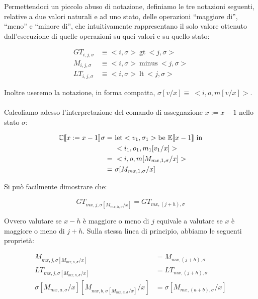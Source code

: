     Permettendoci un piccolo abuso di notazione, definiamo le tre notazioni seguenti, relative a due valori naturali e ad uno stato, delle operazioni ``maggiore di'', ``meno'' e ``minore di'', che intuitivamente rappresentano il solo valore ottenuto dall'esecuzione di quelle operazioni su quei valori e su quello stato:
    
    \begin{align*}
        GT_{i,j,\sigma} &\equiv <i,\sigma>\ \mbox{gt}\ <j, \sigma>\\
        M_{i,j,\sigma} &\equiv <i,\sigma>\ \mbox{minus}\ <j, \sigma>\\
        LT_{i,j,\sigma} &\equiv <i,\sigma>\ \mbox{lt}\ <j, \sigma>
    \end{align*}
    
    Inoltre useremo la notazione, in forma compatta, $\sigma[v/x] \equiv\ <i,o,m[v/x]>$.\\
    \\
    Calcoliamo adesso l'interpretazione del comando di assegnazione $x:=x-1$ nello stato $\sigma$:
    
    \begin{align*}
        \mathbb{C}\doublebracket{x:=x-1}\sigma =\ & \mbox{let} <v_1,\sigma_1> \mbox{be}\ \mathbb{E}\doublebracket{x-1}\ \mbox{in}\\
        &<i_1,o_1,m_1[v_1/x]>\\
        =\ & <i,o,m[M_{mx,1,\sigma}/x]>\\
        =\ & \sigma[M_{mx,1,\sigma}/x]
    \end{align*}
    
    Si può facilmente dimostrare che:
    
    \begin{equation*}
        GT_{mx,j,\sigma[M_{mx,h,\sigma}/x]} = GT_{mx, (j+h), \sigma}
    \end{equation*}
    
    Ovvero valutare se $x-h$ è maggiore o meno di $j$ equivale a valutare se $x$ è maggiore o meno di $j+h$. Sulla stessa linea di principio, abbiamo le seguenti proprietà:
    
    \begin{align*}
        M_{mx,j,\sigma[M_{mx,h,\sigma}/x]} &= M_{mx, (j+h), \sigma}\\
        LT_{mx,j,\sigma[M_{mx,h,\sigma}/x]} &= LT_{mx, (j+h), \sigma}\\
        \sigma[M_{mx,a,\sigma}/x][M_{mx,b,\sigma[M_{mx,a,\sigma}/x]}/x] &= \sigma[M_{mx,(a+b),\sigma}/x]
    \end{align*}
    
